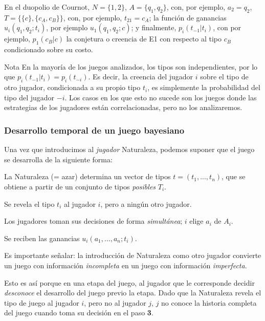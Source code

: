 \documentclass[12pt]{article}
\begin{document}
En el duopolio de Cournot, $N = \{1, 2\}$, $A=\{q_1, q_2 \}$,  con, por ejemplo,  $a_2 = q_2$, $T = \{\{c\}, \{c_A, c_B\}\}$, con, por ejemplo, $t_{21} = c_A$; la función de ganancias $u_i(q_1, q_2; t_i)$, por ejemplo $u_1(q_1, q_2; c)$; y finalmente, $p_i(t_{-1}|t_i)$, con por ejemplo, $p_1(c_B|c)$ la conjetura o creencia de E1 con respecto al tipo $c_B$ condicionado sobre su costo.

\begin{summarybox}[colback=red!15]{Nota}
	En la mayoría de los juegos analizados, los tipos son independientes, por lo que $p_i(t_{-1}|t_i) = p_i(t_{-i})$. Es decir, la creencia del jugador $i$ sobre el tipo de otro jugador, condicionada a su propio tipo $t_i$, es simplemente la probabilidad del tipo del jugador $-i$. Los casos en los que esto no sucede son los juegos donde las estrategias de los jugadores están correlacionadas, pero no los analizaremos.
\end{summarybox}

\subsubsection{Desarrollo temporal de un juego bayesiano}

Una vez que introducimos al \textit{jugador} Naturaleza, podemos suponer que el juego se desarrolla de la siguiente forma:

\begin{myenum}
	\item La Naturaleza (= azar) determina un vector de tipos $t = (t_1,...,t_n)$, que se obtiene a partir de un conjunto de tipos \textit{posibles} $T_i$.
	\item Se revela el tipo $t_i$ al jugador $i$, pero a ningún otro jugador.
	\item Los jugadores toman sus decisiones de forma \textit{simultánea}; $i$ elige $a_i$ de $A_i$.
	\item Se reciben las ganancias $u_i(a_1,...,a_n;t_i)$.
\end{myenum}

Es importante señalar: la introducción de Naturaleza como otro jugador convierte un juego con información \textit{incompleta} en un juego con información \textit{imperfecta}.

Esto es así porque en una etapa del juego, al jugador que le corresponde decidir \textit{desconoce} el desarrollo del juego previo la etapa. Dado que la Naturaleza revela el tipo de juego al jugador $i$, pero no al jugador $j$, $j$ no conoce la historia completa del juego cuando toma su decisión en el paso \textbf{3}.
\end{document}
